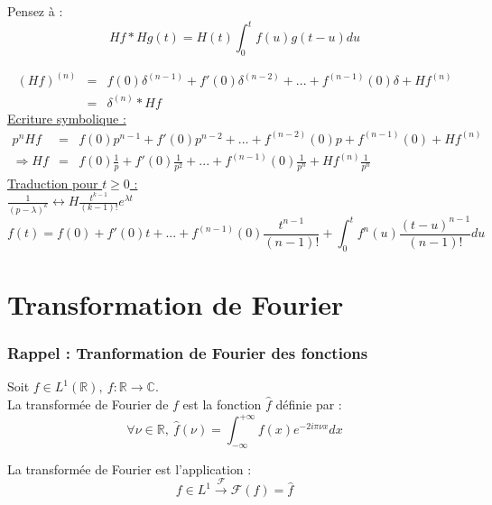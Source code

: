 \documentclass{article}
\begin{document}
\bigskip
Pensez à :
\[Hf*Hg(t) = H(t)\int_0^t f(u) g(t-u) du\]

\begin{eqnarray*}
(Hf)^{(n)}&=&f(0)\delta^{(n-1)}+f'(0)\delta^{(n-2)}+...+f^{(n-1)}(0)\delta+Hf^{(n)} \\
	  &=&\delta^{(n)}*Hf
\end{eqnarray*}
\underline{Ecriture symbolique :} \\
\begin{eqnarray*}
p^nHf &=& f(0)p^{n-1} + f'(0) p^{n-2} +...+f^{(n-2)}(0)p+f^{(n-1)}(0)+Hf^{(n)} \\
\Rightarrow Hf &=& f(0) \frac{1}{p} + f'(0) \frac{1}{p^2} + ... + f^{(n-1)}(0) \frac{1}{p^n} + Hf^{(n)} \frac{1}{p^n}
\end{eqnarray*}
\underline{Traduction pour $t\geq 0$ : } \\
$\frac{1}{(p-\lambda)^k} \leftrightarrow H \frac{t^{k-1}}{(k-1)!} e^{\lambda t}$
\[f(t)=f(0)+f'(0)t+...+f^{(n-1)}(0)\frac{t^{n-1}}{(n-1)!} + \int_0^t f^{n}(u)\frac{(t-u)^{n-1}}{(n-1)!} du\]

\newpage
\part{Transformation de Fourier}

\section{Rappel : Tranformation de Fourier des fonctions}
Soit $f\in L^1(\mathbb{R}),\ f:\mathbb{R}\to\mathbb{C}$. \\
La transformée de Fourier de $f$ est la fonction $\hat{f}$ définie par : \[\forall \nu \in \mathbb{R},\ \hat{f}(\nu)=\int_{-\infty}^{+\infty} f(x)e^{-2i\pi\nu x} dx\]

La transformée de Fourier est l'application : \[f\in L^1 \xrightarrow{\mathcal{F}} \mathcal{F}(f)=\hat{f}\]

\end{document}
